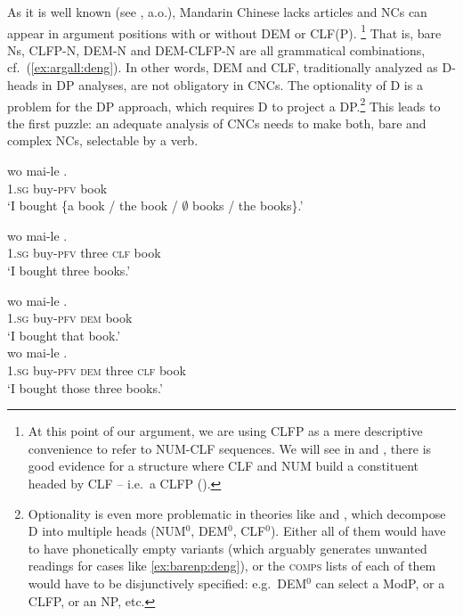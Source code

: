 \documentclass[output=paper,colorlinks,citecolor=brown]{langscibook}
\begin{document}
As it is well known (see \citealt{Chierchia98a}, a.o.), Mandarin Chinese lacks articles and NCs can appear in argument positions with or without DEM or CLF(P).%
%
\footnote{At this point of our argument, we are using CLFP as a mere descriptive convenience to refer to NUM-CLF sequences. We will see in  and , there is good evidence for a  structure where CLF and NUM build a constituent headed by CLF -- i.e.\ a CLFP (\citealt{Bale2019a, Her&Tsai20, Wkagiel2020a, Wkagiel2021a}).} %
%
That is, bare Ns, CLFP-N, DEM-N and DEM-CLFP-N are all grammatical combinations, cf.\ (\ref{ex:argall:deng}). In other words, DEM and CLF, traditionally analyzed as D-heads in DP analyses, %
are not obligatory in CNCs. The optionality of D is a problem for the DP approach, which requires D to project a DP.\footnote{Optionality is even more problematic in theories like \citet{Cheng&Sybesma99a} and \citet{Cinque05b, Cinque23a}, which decompose D into multiple heads (NUM$^{0}$, DEM$^{0}$, CLF$^{0}$). Either all of them would have to have phonetically empty variants (which arguably generates unwanted readings for cases like \ref{ex:barenp:deng}), or the \textsc{comps} lists of each of them would have to be disjunctively specified: e.g.\ DEM$^{0}$ can select a ModP, or a CLFP, or an NP, etc.} This leads to the first puzzle: an adequate analysis of CNCs needs to make both, bare and complex NCs, selectable by a verb.


\settowidth{} 
\ea \label{ex:argall:deng}	
\ea \label{ex:barenp:deng}	
\gll wo mai-le .\\
1.\textsc{sg} buy-\textsc{pfv} book\\ 
\glt `I bought \{a book / the book / $\emptyset$ books / the books\}.'

\ex 
\gll wo mai-le   .\\
1.\textsc{sg} buy-\textsc{pfv}  three \textsc{clf} book\\
\glt `I bought three books.' 

\ex  
\gll wo mai-le  .\\
1.\textsc{sg} buy-\textsc{pfv} \textsc{dem} book\\
\glt `I bought that book.' \\

\ex
\gll wo mai-le    .\\
1.\textsc{sg} buy-\textsc{pfv} \textsc{dem} three \textsc{clf} book\\
\glt `I bought those three books.' 
\end{document}
